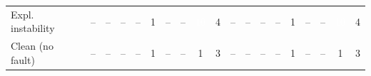 \begin{table}[t]
\begin{tabular}{l|ccccccccc|ccccccccc}
Expl. instability & -- & -- & -- & -- & \cellcolor[RGB]{186,214,248}1 & -- & -- & \cellcolor[RGB]{37,106,191}\textcolor{white}{10} & \cellcolor[RGB]{129,179,239}4 & -- & -- & -- & -- & \cellcolor[RGB]{186,214,248}1 & -- & -- & \cellcolor[RGB]{37,106,191}\textcolor{white}{10} & \cellcolor[RGB]{129,179,239}4 \\
Clean (no fault) & -- & -- & -- & -- & \cellcolor[RGB]{186,214,248}1 & -- & -- & \cellcolor[RGB]{186,214,248}1 & \cellcolor[RGB]{148,191,242}3 & -- & -- & -- & -- & \cellcolor[RGB]{186,214,248}1 & -- & -- & \cellcolor[RGB]{186,214,248}1 & \cellcolor[RGB]{148,191,242}3 \\
\bottomrule
\end{tabular}
\end{table}

